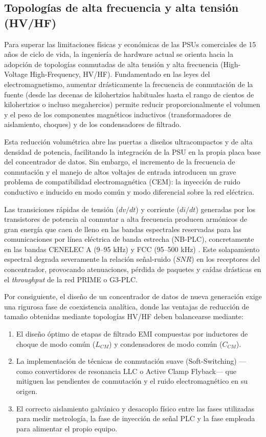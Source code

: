 \subsection{Topologías de alta frecuencia y alta tensión (HV/HF)}
\label{subsec:topologias_alta_frecuencia_tension}

Para superar las limitaciones físicas y económicas de las PSUs comerciales de 15 años de ciclo de vida, la ingeniería de hardware actual se orienta hacia la adopción de topologías conmutadas de alta tensión y alta frecuencia (High-Voltage High-Frequency, HV/HF). Fundamentado en las leyes del electromagnetismo, aumentar drásticamente la frecuencia de conmutación de la fuente (desde las decenas de kilohertzios habituales hasta el rango de cientos de kilohertzios o incluso megahercios) permite reducir proporcionalmente el volumen y el peso de los componentes magnéticos inductivos (transformadores de aislamiento, choques) y de los condensadores de filtrado.

Esta reducción volumétrica abre las puertas a diseños ultracompactos y de alta densidad de potencia, facilitando la integración de la PSU en la propia placa base del concentrador de datos. Sin embargo, el incremento de la frecuencia de conmutación y el manejo de altos voltajes de entrada introducen un grave problema de compatibilidad electromagnética (CEM): la inyección de ruido conductivo e inducido en modo común y modo diferencial sobre la red eléctrica.

Las transiciones rápidas de tensión ($dv/dt$) y corriente ($di/dt$) generadas por los transistores de potencia al conmutar a alta frecuencia producen armónicos de gran energía que caen de lleno en las bandas espectrales reservadas para las comunicaciones por línea eléctrica de banda estrecha (NB-PLC), concretamente en las bandas CENELEC A (9--95 kHz) y FCC (95--500 kHz) \cite{SHARMA2017704, 6679210}. Este solapamiento espectral degrada severamente la relación señal-ruido ($SNR$) en los receptores del concentrador, provocando atenuaciones, pérdida de paquetes y caídas drásticas en el \textit{throughput} de la red PRIME o G3-PLC.

Por consiguiente, el diseño de un concentrador de datos de nueva generación exige una rigurosa fase de coexistencia analítica, donde las ventajas de reducción de tamaño obtenidas mediante topologías HV/HF deben balancearse mediante:
\begin{enumerate}
    \item El diseño óptimo de etapas de filtrado EMI compuestas por inductores de choque de modo común ($L_{CM}$) y condensadores de modo común ($C_{CM}$).
    \item La implementación de técnicas de conmutación suave (Soft-Switching) —como convertidores de resonancia LLC o Active Clamp Flyback— que mitiguen las pendientes de conmutación y el ruido electromagnético en su origen.
    \item El correcto aislamiento galvánico y desacoplo físico entre las fases utilizadas para medir metrología, la fase de inyección de señal PLC y la fase empleada para alimentar el propio equipo.
\end{enumerate}

